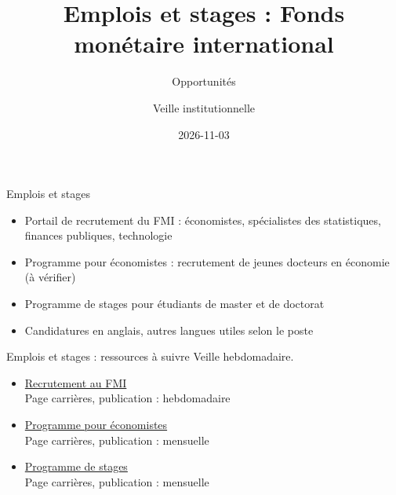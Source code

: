 \documentclass[aspectratio=169,11pt]{beamer}
\title{Emplois et stages : Fonds monétaire international}
\subtitle{Opportunités}
\author{Veille institutionnelle}
\date{2026-11-03}
\begin{document}
\begin{frame}\titlepage\end{frame}

\begin{frame}{Emplois et stages}
\begin{itemize}
\item Portail de recrutement du FMI : économistes, spécialistes des statistiques, finances publiques, technologie
\item Programme pour économistes : recrutement de jeunes docteurs en économie (à vérifier)
\item Programme de stages pour étudiants de master et de doctorat
\item Candidatures en anglais, autres langues utiles selon le poste
\end{itemize}
\end{frame}

\begin{frame}{Emplois et stages : ressources à suivre}
\small
Veille hebdomadaire.
\begin{itemize}
\item \href{https://www.imf.org/en/About/Recruitment}{Recrutement au FMI}\\{\footnotesize Page carrières, publication : hebdomadaire}
\item \href{https://www.imf.org/en/About/Recruitment/economist-program}{Programme pour économistes}\\{\footnotesize Page carrières, publication : mensuelle}
\item \href{https://www.imf.org/en/About/Recruitment/internship-program}{Programme de stages}\\{\footnotesize Page carrières, publication : mensuelle}
\end{itemize}
\end{frame}
\end{document}
